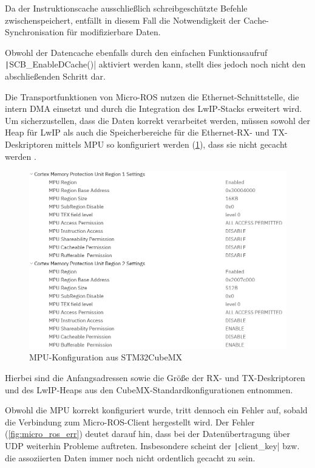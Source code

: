 Da der Instruktionscache ausschließlich schreibgeschützte Befehle
zwischenspeichert, entfällt in diesem Fall die Notwendigkeit der
Cache-Synchronisation für modifizierbare Daten.

Obwohl der Datencache ebenfalls durch den einfachen Funktionsaufruf
\texttt|SCB_EnableDCache()| aktiviert werden kann, stellt dies jedoch
noch nicht den abschließenden Schritt dar.

Die Transportfunktionen von Micro-ROS nutzen die Ethernet-Schnittstelle, die
intern DMA einsetzt und durch die Integration des \ac{LwIP}-Stacks erweitert
wird. Um sicherzustellen, dass die Daten korrekt verarbeitet werden, müssen
sowohl der Heap für LwIP als auch die Speicherbereiche für die Ethernet-RX- und
TX-Deskriptoren mittels \ac{MPU} so konfiguriert werden (\ref{fig:conf_cubemx}),
dass sie nicht gecacht werden \cite{STM32H7_LwIP_Examples}.

\begin{figure}[H]
    \centering
    \includegraphics[width=1\textwidth]{assets/mpu_conf_cubemx}
    \caption{MPU-Konfiguration aus STM32CubeMX}
    \label{fig:conf_cubemx}
\end{figure}

Hierbei sind die Anfangsadressen sowie die Größe der RX- und TX-Deskriptoren
und des LwIP-Heaps aus den CubeMX-Standardkonfigurationen entnommen.

Obwohl die MPU korrekt konfiguriert wurde, tritt dennoch ein Fehler auf, sobald
die Verbindung zum Micro-ROS-Client hergestellt wird. Der Fehler
(\ref{fig:micro_ros_err}) deutet darauf hin, dass bei der Datenübertragung über
UDP weiterhin Probleme auftreten. Insbesondere scheint der
\texttt|client_key| bzw. die assoziierten Daten immer noch nicht
ordentlich gecacht zu sein.

